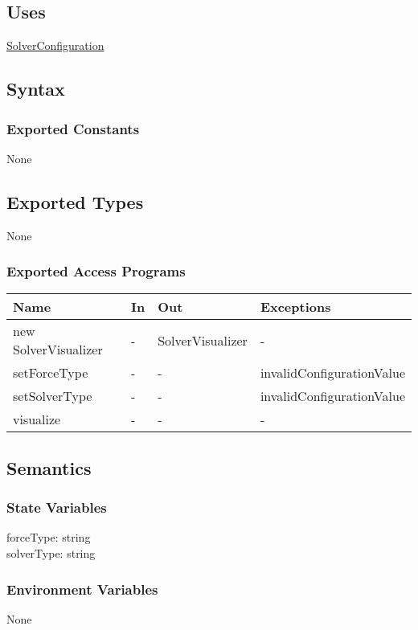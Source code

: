 \documentclass[12pt, titlepage]{article}
\begin{document}
\subsection{Uses}
\hyperref[SolverConfiguration]{SolverConfiguration}

\subsection{Syntax}

\subsubsection{Exported Constants}
None
\subsection{Exported Types}
None

\subsubsection{Exported Access Programs}
\begin{center}
\begin{tabular}{p{5cm} p{2cm} p{4cm} p{5.5cm}}
\hline
\textbf{Name} & \textbf{In} & \textbf{Out} & \textbf{Exceptions} \\
\hline
new SolverVisualizer & - & SolverVisualizer & - \\
\hline
setForceType & - & - & invalidConfigurationValue \\
\hline
setSolverType & - & - & invalidConfigurationValue\\
\hline
visualize & - & - & - \\
\hline
\end{tabular}
\end{center}

\subsection{Semantics}

\subsubsection{State Variables}
forceType: string\\
solverType: string
\subsubsection{Environment Variables}
None
\end{document}
